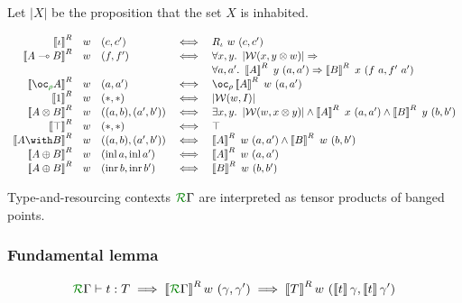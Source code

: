 Let $\left| X \right|$ be the proposition that the set $X$ is inhabited.

\begin{displaymath}
  \begin{array}{rllcl}
    \sem{\base}^R & w & (c,c') &\iff& R_\base~w~(c,c') \\
    \sem{\fun{A}{B}}^R & w & (f,f')
                               &\iff& \forall x,y.~
                                 \left| \mathcal W(x, y \otimes w) \right|
                                 \Rightarrow \\
    &&&& \forall a,a'.~\sem{A}^R~y~(a,a')
                                 \Rightarrow \sem{B}^R~x~(f~a,f'~a') \\
    \sem{\excl{\rho}{A}}^R & w & (a,a') &\iff& \oc_\rho \sem{A}^R~w~(a,a') \\
    \sem{\tensorOne}^R & w & (*,*) &\iff& \left|\mathcal W(w, I)\right| \\
    \sem{\tensor{A}{B}}^R & w & ((a,b),(a',b'))
                               &\iff& \exists x,y.~
                                 \left| \mathcal W(w, x \otimes y) \right|
                                 \wedge \sem{A}^R~x~(a,a')
                                 \wedge \sem{B}^R~y~(b,b') \\
    \sem{\withTOne}^R & w & (*,*) &\iff& \top \\
    \sem{\withT{A}{B}}^R & w & ((a,b),(a',b')) &\iff&
    \sem{A}^R~w~(a,a') \wedge \sem{B}^R~w~(b,b') \\
    \sem{\sumT{A}{B}}^R & w & (\operatorname{inl} a,\operatorname{inl} a')
                               &\iff& \sem{A}^R~w~(a,a') \\
    \sem{\sumT{A}{B}}^R & w & (\operatorname{inr} b,\operatorname{inr} b')
                               &\iff& \sem{B}^R~w~(b,b') \\
  \end{array}
\end{displaymath}

Type-and-resourcing contexts $\ctx{\Gamma}{R}$ are interpreted as
tensor products of banged points.


\subsubsection{Fundamental lemma}

\begin{displaymath}
  \ctx{\Gamma}{R} \vdash t : T \implies \sem{\ctx{\Gamma}{R}}^R w~(\gamma, \gamma') \implies \sem{T}^R w~(\sem{t}\gamma, \sem{t}\gamma')
\end{displaymath}

